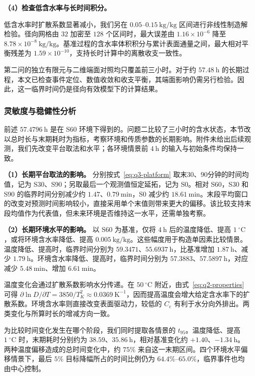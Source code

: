 \documentclass[UTF8,a4paper]{ctexart}
\begin{document}
\noindent\textbf{（4）检查低含水率与长时间积分。}

低含水率时扩散系数显著减小，我们另在 \(0.05\)--\(0.15~\mathrm{kg/kg}\) 区间进行非线性制造解检验。径向网格由 \(32\) 加密至 \(128\) 个区间时，最大误差由 \(1.16\times10^{-6}\) 降至 \(8.78\times10^{-8}~\mathrm{kg/kg}\)。基准过程的含水率体积积分与累计表面通量之间，最大相对平衡残差为 \(1.59\times10^{-10}\)，支持长时计算中的离散收支一致性。

第二问的独立有限元与二维端面对照均只覆盖前三小时。对于约 \(57.48~\mathrm h\) 的长期过程，本文已检查事件定位、数值收敛和收支平衡，其端面影响仍需另行检验。因此，这一临界时间仍是径向有效模型下的计算结果。

\subsubsection{灵敏度与稳健性分析}
\label{sec:q3-sensitivity}

前述 \(57.4796~\mathrm h\) 是在 S60 环境下得到的。问题二比较了三小时的含水状态，本节改以总时长与末期耗时为指标，考察环境和传质参数的长期影响。附件未给出后续观测，我们先改变平台取法和水平；各环境情景前 \(4~\mathrm h\) 的输入与初始条件均保持一致。

\noindent\textbf{（1）长期平台取法的影响。}
分别按式~\eqref{eq:q3-platform} 取末30、90分钟的时间均值，记为 S30、S90；另取最后一个观测值恒定延拓，记为 S0。相对 S60，S30 和 S90 的临界时间分别减少约 \(1.47\)、\(0.79~\mathrm{min}\)，S0 减少约 \(18.61~\mathrm{min}\)。末段平均窗口的改变对预测时间影响较小，直接采用单个末值则带来更大的偏移。该比较支持末段均值作为代表值，但未来环境是否维持这一水平，还需单独考察。

\noindent\textbf{（2）长期环境水平的影响。}
以 S60 为基准，仅将 \(4~\mathrm h\) 后的温度降低、提高 \(1~^\circ\mathrm C\)，或将环境含水率降低、提高 \(0.005~\mathrm{kg/kg}\)。这些幅度用于构造单因素比较情景。温度降低、提高时，临界时间分别为 \(59.3471\)、\(55.6937~\mathrm h\)，比基准增加 \(1.87~\mathrm h\)、减少 \(1.79~\mathrm h\)。环境含水率降低、提高时，临界时间分别为 \(57.3883\)、\(57.5897~\mathrm h\)，对应减少 \(5.48~\mathrm{min}\)、增加 \(6.61~\mathrm{min}\)。

温度变化会通过扩散系数影响水分传递。在 \(50~^\circ\mathrm C\) 附近，由式~\eqref{eq:q2-properties} 可得 \(\partial\ln D/\partial T=3850/T_K^2\approx0.0369~\mathrm{K^{-1}}\)，因而提高温度会增大给定含水率下的扩散系数。环境含水率则直接改变表面驱动力，较低的 \(C_e\) 有利于水分向外排出。两类变化与所算时长的增减方向一致。

为比较时间变化发生在哪个阶段，我们同时提取各情景的 \(t_{95}\)。温度降低、提高 \(1~^\circ\mathrm C\) 时，末期耗时分别约为 \(38.59\)、\(35.86~\mathrm h\)，相对基准变化约 \(+1.40\)、\(-1.34~\mathrm h\)。两种温度偏移造成的总时间变化中，约 \(75\%\) 来自这一末期区间。四个环境水平偏移情景下，最后 \(5\%\) 目标降幅所占的时间比例仍为 \(64.4\%\)--\(65.0\%\)，临界事件也均由中心控制。
\end{document}
